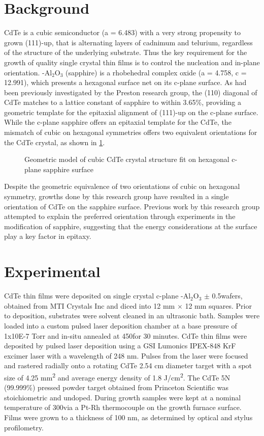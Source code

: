 \section{Background}
CdTe is a cubic semiconductor (a = 6.483) with a very strong propensity to grown 
(111)-up, that is 
alternating layers of cadnimum and telurium, regardless of the structure of the 
underlying substrate. Thus the key requirement for the growth of quality single crystal 
thin films is to control the nucleation and in-plane orientation. \textalpha-Al$_2$O$_3$ 
(sapphire) 
is a rhobehedral complex oxide (a = 4.758, c = 12.991), which presents a hexagonal surface net 
on its c-plane surface. As had been previously investigated by the Preston research 
group, the (110) diagonal of CdTe matches to a lattice constant of sapphire to within 
3.65\%, providing a geometric template for the epitaxial alignment of (111)-up on the 
c-plane surface. While the c-plane sapphire offers an epitaxial template for the CdTe, 
the mismatch of cubic on hexagonal symmetries offers two equivalent orientations for the 
CdTe crystal, as shown in \cref{fig:cdteliftoff_geometry}.
\begin{figure}
    \centering
    \caption{\label{fig:cdteliftoff_geometry}Geometric model of cubic CdTe crystal 
    structure fit on hexagonal c-plane sapphire surface}
\end{figure}
Despite the geometric equivalence of two orientations of cubic on hexagonal symmetry, 
growths done by this research group have resulted in a single orientation of CdTe on the 
sapphire surface. Previous work by this research group attempted to explain the preferred 
orientation through experiments in the modification of sapphire\cite{Neretina2009b}, 
suggesting that the energy considerations at the surface play a key factor in epitaxy.
\section{Experimental}
CdTe thin films were deposited on single crystal c-plane \textalpha-Al$_2$O$_3$ $\pm$ 
0.5\degree wafers, obtained from MTI Crystals Inc and diced into 12 mm $\times$ 12 mm 
squares. Prior to deposition, substrates were solvent cleaned in an ultrasonic bath. 
Samples were loaded into a custom pulsed laser deposition chamber at a base pressure of 
1x10E-7 Torr and in-situ annealed at 450\degree\celsius for 30 minutes. CdTe thin films 
were deposited by pulsed laser deposition using a GSI Lumonics IPEX-848 KrF excimer laser 
with a wavelength of 248 nm. Pulses from the laser were focused and rastered radially 
onto a rotating CdTe 2.54 cm diameter target with a spot size of 4.25 
mm\textsuperscript{2} and average 
energy density of 1.8 J/cm\textsuperscript{2}. The CdTe 5N (99.999\%) pressed powder 
target obtained from 
Princeton Scientific was stoichiometric and undoped. During growth samples were kept at a 
nominal temperature of 300\degree\celsius via a Pt-Rh thermocouple on the growth furnace 
surface. 
Films were grown to a thickness of 100 nm, as determined by optical and stylus 
profilometry.

